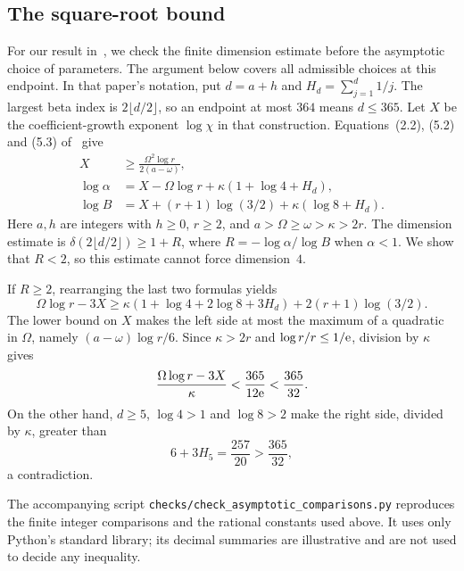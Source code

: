 \subsection{The square-root bound}

For our result in~\cite{T26}, we check the finite dimension estimate
before the asymptotic choice of parameters. The argument below covers
all admissible choices at this endpoint. In that paper's notation, put $d=a+h$ and
$H_d=\sum_{j=1}^d1/j$. The largest beta index is
$2\lfloor d/2\rfloor$, so an endpoint at most $364$ means $d\leq365$.
Let $X$ be the coefficient-growth exponent $\log\chi$ in that construction.
Equations~(2.2), (5.2) and (5.3) of~\cite{T26} give
\begin{align*}
 X&\geq\frac{\Omega^2\log r}{2(a-\omega)},\\
 \log\alpha&=X-\Omega\log r+\kappa(1+\log4+H_d),\\
 \log B&=X+(r+1)\log(3/2)+\kappa(\log8+H_d).
\end{align*}
Here $a,h$ are integers with $h\geq0$, $r\geq2$, and
$a>\Omega\geq\omega>\kappa>2r$.
The dimension estimate is $\delta(2\lfloor d/2\rfloor)\geq1+R$,
where $R=-\log\alpha/\log B$ when $\alpha<1$.
We show that $R<2$, so this estimate cannot force dimension~$4$.

If $R\geq2$, rearranging the last two formulas yields
\[
 \Omega\log r-3X\geq
 \kappa(1+\log4+2\log8+3H_d)+2(r+1)\log(3/2).
\]
The lower bound on $X$ makes the left side at most the maximum of a
quadratic in $\Omega$, namely $(a-\omega)\log r/6$.
Since $\kappa>2r$ and $\log r/r\leq1/\mathrm e$, division by $\kappa$ gives
\[
 \frac{\Omega\log r-3X}{\kappa}
 <\frac{365}{12\mathrm e}<\frac{365}{32}.
\]
On the other hand, $d\geq5$, $\log4>1$ and $\log8>2$ make the right
side, divided by $\kappa$, greater than
\[
 6+3H_5=\frac{257}{20}>\frac{365}{32},
\]
a contradiction.

The accompanying script \texttt{checks/check\_asymptotic\_comparisons.py}
reproduces the finite integer comparisons and the rational constants used
above. It uses only Python's standard library; its decimal summaries
are illustrative and are not used to decide any inequality.
